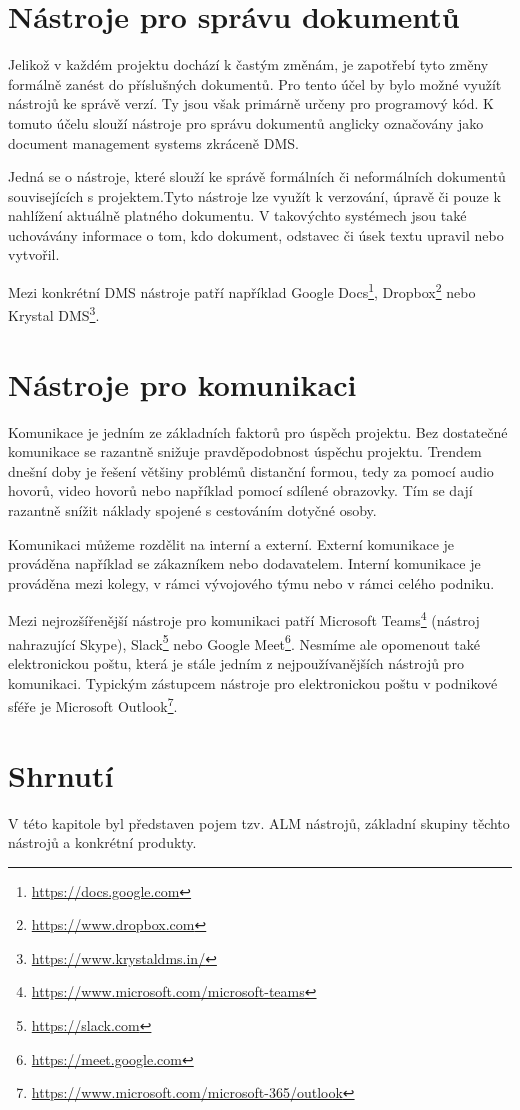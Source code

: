 \documentclass[czech,DP]{thesiskiv}
\begin{document}
\section{Nástroje pro správu dokumentů}
Jelikož v každém projektu dochází k častým změnám, je zapotřebí tyto změny formálně zanést do příslušných dokumentů.  Pro tento účel by bylo možné využít nástrojů ke správě verzí. Ty jsou však primárně určeny pro programový kód. K tomuto účelu slouží nástroje pro správu dokumentů anglicky označovány jako document management systems zkráceně DMS.
\par
Jedná se o nástroje, které slouží ke správě formálních či neformálních dokumentů souvisejících s projektem.Tyto nástroje lze využít k verzování, úpravě či pouze k nahlížení aktuálně platného dokumentu. V takovýchto systémech jsou také uchovávány informace o tom, kdo dokument, odstavec či úsek textu upravil nebo vytvořil. 
\par
Mezi konkrétní DMS nástroje patří například Google Docs\footnote{\url{https://docs.google.com}}, Dropbox\footnote{\url{https://www.dropbox.com}} nebo Krystal DMS\footnote{\url{https://www.krystaldms.in/}}.
\section{Nástroje pro komunikaci}
Komunikace je jedním ze základních faktorů pro úspěch projektu. Bez dostatečné komunikace se razantně snižuje pravděpodobnost úspěchu projektu. Trendem dnešní doby je řešení většiny problémů distanční formou, tedy za pomocí audio hovorů, video hovorů nebo například pomocí sdílené obrazovky. Tím se dají razantně snížit náklady spojené s cestováním dotyčné osoby.
\par 
Komunikaci můžeme rozdělit na interní a externí. Externí komunikace je prováděna například se zákazníkem nebo dodavatelem. Interní komunikace je prováděna mezi kolegy, v rámci vývojového týmu nebo v rámci celého podniku.
\par
Mezi nejrozšířenější nástroje pro komunikaci patří Microsoft Teams\footnote{\url{https://www.microsoft.com/microsoft-teams}} (nástroj nahrazující Skype), Slack\footnote{\url{https://slack.com}} nebo Google Meet\footnote{\url{https://meet.google.com}}. Nesmíme ale opomenout také elektronickou poštu, která je stále jedním z nejpoužívanějších nástrojů pro komunikaci. Typickým zástupcem nástroje pro elektronickou poštu v podnikové sféře je Microsoft Outlook\footnote{\url{https://www.microsoft.com/microsoft-365/outlook}}.
\section{Shrnutí}
V této kapitole byl představen pojem tzv. ALM nástrojů, základní skupiny těchto nástrojů a konkrétní produkty. 
\end{document}
